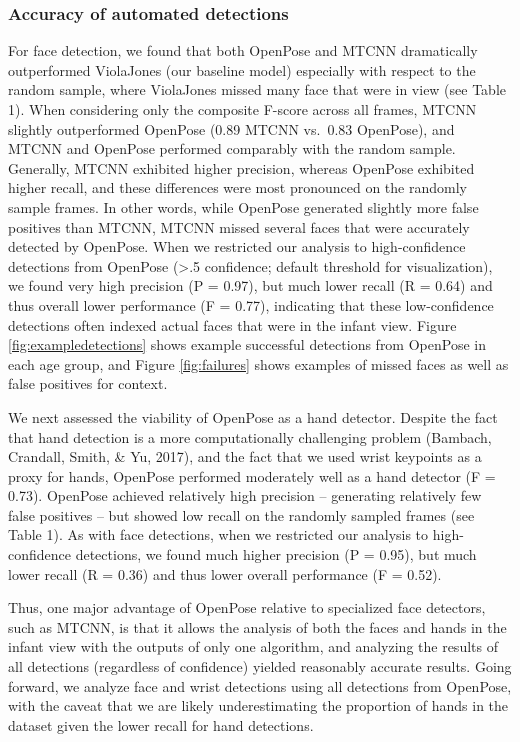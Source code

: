 \documentclass[english,man]{apa6}
\begin{document}
\subsubsection{Accuracy of automated
detections}\label{accuracy-of-automated-detections}

For face detection, we found that both OpenPose and MTCNN dramatically
outperformed ViolaJones (our baseline model) especially with respect to
the random sample, where ViolaJones missed many face that were in view
(see Table 1). When considering only the composite F-score across all
frames, MTCNN slightly outperformed OpenPose (0.89 MTCNN vs.~0.83
OpenPose), and MTCNN and OpenPose performed comparably with the random
sample. Generally, MTCNN exhibited higher precision, whereas OpenPose
exhibited higher recall, and these differences were most pronounced on
the randomly sample frames. In other words, while OpenPose generated
slightly more false positives than MTCNN, MTCNN missed several faces
that were accurately detected by OpenPose. When we restricted our
analysis to high-confidence detections from OpenPose (\textgreater{}.5
confidence; default threshold for visualization), we found very high
precision (P = 0.97), but much lower recall (R = 0.64) and thus overall
lower performance (F = 0.77), indicating that these low-confidence
detections often indexed actual faces that were in the infant view.
Figure \ref{fig:exampledetections} shows example successful detections
from OpenPose in each age group, and Figure \ref{fig:failures} shows
examples of missed faces as well as false positives for context.

We next assessed the viability of OpenPose as a hand detector. Despite
the fact that hand detection is a more computationally challenging
problem (Bambach, Crandall, Smith, \& Yu, 2017), and the fact that we
used wrist keypoints as a proxy for hands, OpenPose performed moderately
well as a hand detector (F = 0.73). OpenPose achieved relatively high
precision -- generating relatively few false positives -- but showed low
recall on the randomly sampled frames (see Table 1). As with face
detections, when we restricted our analysis to high-confidence
detections, we found much higher precision (P = 0.95), but much lower
recall (R = 0.36) and thus lower overall performance (F = 0.52).

Thus, one major advantage of OpenPose relative to specialized face
detectors, such as MTCNN, is that it allows the analysis of both the
faces and hands in the infant view with the outputs of only one
algorithm, and analyzing the results of all detections (regardless of
confidence) yielded reasonably accurate results. Going forward, we
analyze face and wrist detections using all detections from OpenPose,
with the caveat that we are likely underestimating the proportion of
hands in the dataset given the lower recall for hand detections.
\end{document}
